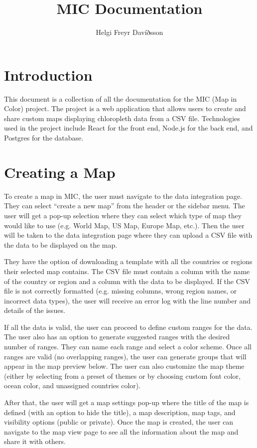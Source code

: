 \documentclass{article}
\title{MIC Documentation}
\author{Helgi Freyr Davíðsson}
\date{} %
\begin{document}
\maketitle

\section{Introduction}

This document is a collection of all the documentation for the MIC (Map in Color) project. The project is a web application that allows users to create and share custom maps displaying chloropleth data from a CSV file. Technologies used in the project include React for the front end, Node.js for the back end, and Postgres for the database.

\section{Creating a Map}
To create a map in MIC, the user must navigate to the data integration page. They can select “create a new map” from the header or the sidebar menu. The user will get a pop-up selection where they can select which type of map they would like to use (e.g. World Map, US Map, Europe Map, etc.). Then the user will be taken to the data integration page where they can upload a CSV file with the data to be displayed on the map. 

They have the option of downloading a template with all the countries or regions their selected map contains. The CSV file must contain a column with the name of the country or region and a column with the data to be displayed. If the CSV file is not correctly formatted (e.g. missing columns, wrong region names, or incorrect data types), the user will receive an error log with the line number and details of the issues. 

If all the data is valid, the user can proceed to define custom ranges for the data. The user also has an option to generate suggested ranges with the desired number of ranges. They can name each range and select a color scheme. Once all ranges are valid (no overlapping ranges), the user can generate groups that will appear in the map preview below. The user can also customize the map theme (either by selecting from a preset of themes or by choosing custom font color, ocean color, and unassigned countries color). 

After that, the user will get a map settings pop-up where the title of the map is defined (with an option to hide the title), a map description, map tags, and visibility options (public or private). Once the map is created, the user can navigate to the map view page to see all the information about the map and share it with others.
\end{document}
